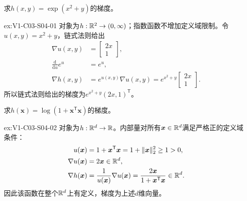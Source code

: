 \begin{SLChapterExercisePairSection}
\begin{exercise}[标量复合]\label{ex:V1-C03-S04-01}
求$h(x,y)=\exp(x^2+y)$的梯度。
\end{exercise}
\label{sol:V1-C03-S04-01}
\begin{chapterexercisesolution}{ex:V1-C03-S04-01}
对象为$h:\mathbb{R}^2\to(0,\infty)$；指数函数不增加定义域限制。令$u(x,y)=x^2+y$，链式法则给出
\[
\begin{aligned}
\nabla u(x,y)&=\begin{bmatrix}2x\\1\end{bmatrix},\\
\frac{\mathrm d}{\mathrm du}e^u&=e^u,\\
\nabla h(x,y)&=e^{u(x,y)}\nabla u(x,y)
=e^{x^2+y}\begin{bmatrix}2x\\1\end{bmatrix}.
\end{aligned}
\]
所以链式法则给出的梯度为$e^{x^2+y}(2x,1)^{\mathsf T}$。
\end{chapterexercisesolution}

\begin{exercise}[对数复合]\label{ex:V1-C03-S04-02}
求$h(\boldsymbol{x})=\log(1+\boldsymbol{x}^{\mathsf T}\boldsymbol{x})$的梯度。
\end{exercise}
\label{sol:V1-C03-S04-02}
\begin{chapterexercisesolution}{ex:V1-C03-S04-02}
对象为$h:\mathbb{R}^d\to\mathbb{R}$。内部量对所有$\boldsymbol x\in\mathbb{R}^d$满足严格正的定义域条件：
\[
\begin{aligned}
u(\boldsymbol x)&=1+\boldsymbol x^{\mathsf T}\boldsymbol x
=1+\lVert\boldsymbol x\rVert_2^2\ge1>0,\\
\nabla u(\boldsymbol x)&=2\boldsymbol x\in\mathbb{R}^d,\\
\nabla h(\boldsymbol x)
&=\frac{1}{u(\boldsymbol x)}\nabla u(\boldsymbol x)
=\frac{2\boldsymbol x}{1+\boldsymbol x^{\mathsf T}\boldsymbol x}\in\mathbb{R}^d.
\end{aligned}
\]
因此该函数在整个$\mathbb{R}^d$上有定义，梯度为上述$d$维向量。
\end{chapterexercisesolution}


\end{SLChapterExercisePairSection}
